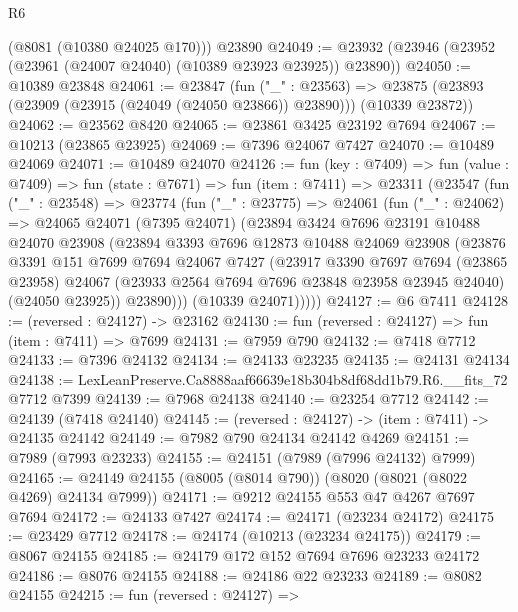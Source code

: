 \begin{lexlean}{R6}
\begin{coremodule}
      (@8081 (@10380 @24025 @170)))
    @23890
@24049 := @23932 (@23946 (@23952 (@23961 (@24007 @24040) (@10389 @23923 @23925)) @23890))
@24050 := @10389 @23848
@24061 := @23847
    (fun ("_" : @23563) =>
    @23875 (@23893 (@23909 (@23915 (@24049 (@24050 @23866)) @23890))) (@10339 @23872))
@24062 := @23562 @8420
@24065 := @23861 @3425 @23192 @7694
@24067 := @10213 (@23865 @23925)
@24069 := @7396 @24067 @7427
@24070 := @10489 @24069
@24071 := @10489 @24070
@24126 := fun (key : @7409) =>
  fun (value : @7409) =>
  fun (state : @7671) =>
  fun (item : @7411) =>
  @23311
    (@23547
      (fun ("_" : @23548) =>
      @23774
        (fun ("_" : @23775) =>
        @24061
          (fun ("_" : @24062) =>
          @24065
            @24071
            (@7395 @24071)
            (@23894
              @3424
              @7696
              @23191
              @10488
              @24070
              @23908
              (@23894
                @3393
                @7696
                @12873
                @10488
                @24069
                @23908
                (@23876
                  @3391
                  @151
                  @7699
                  @7694
                  @24067
                  @7427
                  (@23917
                    @3390
                    @7697
                    @7694
                    (@23865 @23958)
                    @24067
                    (@23933 @2564 @7694 @7696 @23848 @23958 @23945 @24040)
                    (@24050 @23925))
                  @23890)))
            (@10339 @24071)))))
@24127 := @6 @7411
@24128 := (reversed : @24127) -> @23162
@24130 := fun (reversed : @24127) => fun (item : @7411) => @7699
@24131 := @7959 @790
@24132 := @7418 @7712
@24133 := @7396 @24132
@24134 := @24133 @23235
@24135 := @24131 @24134
@24138 := LexLeanPreserve.Ca8888aaf66639e18b304b8df68dd1b79.R6.__fits_72 @7712 @7399
@24139 := @7968 @24138
@24140 := @23254 @7712
@24142 := @24139 (@7418 @24140)
@24145 := (reversed : @24127) -> (item : @7411) -> @24135 @24142
@24149 := @7982 @790 @24134 @24142 @4269
@24151 := @7989 (@7993 @23233)
@24155 := @24151 (@7989 (@7996 @24132) @7999)
@24165 := @24149 @24155 (@8005 (@8014 @790)) (@8020 (@8021 (@8022 @4269) @24134 @7999))
@24171 := @9212 @24155 @553 @47 @4267 @7697 @7694
@24172 := @24133 @7427
@24174 := @24171 (@23234 @24172)
@24175 := @23429 @7712
@24178 := @24174 (@10213 (@23234 @24175))
@24179 := @8067 @24155
@24185 := @24179 @172 @152 @7694 @7696 @23233 @24172
@24186 := @8076 @24155
@24188 := @24186 @22 @23233
@24189 := @8082 @24155
@24215 := fun (reversed : @24127) =>

\end{coremodule}
\end{lexlean}
